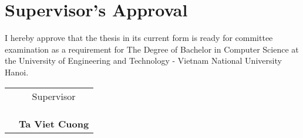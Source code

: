 \chapter*{Supervisor's Approval}

I hereby approve that the thesis in its current form is ready for committee examination as a requirement for The Degree of Bachelor in Computer Science at the University of Engineering and Technology - Vietnam National University Hanoi.
\begin{table}[!ht]
\begin{tabular}{p{}c}
 & Supervisor \\
 &              \\
 &              \\
 &              \\
 & \hspace{0.01cm} \textbf{Ta Viet Cuong} 
\end{tabular}
\end{table}
